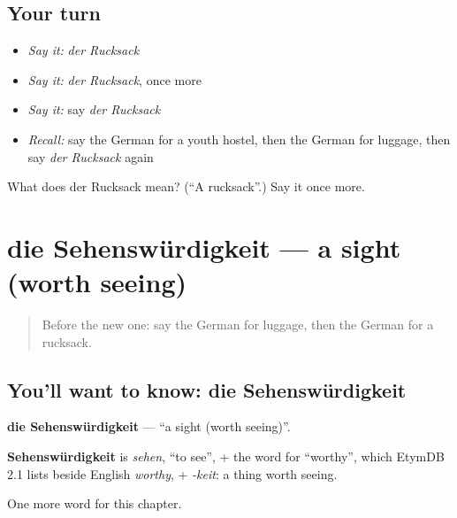 \subsection*{Your turn}
\begin{itemize}
\raggedright
  \item \emph{Say it:} \emph{der Rucksack}
  \item \emph{Say it:} \emph{der Rucksack}, once more
  \item \emph{Say it:} say \emph{der Rucksack}
  \item \emph{Recall:} say the German for a youth hostel, then the German for luggage, then say \emph{der Rucksack} again
\end{itemize}

\begin{tcolorbox}[breakable,colback=teal!4,colframe=teal!35!black,title={Before you move on}]
What does der Rucksack mean? (\textquotedblleft{}A rucksack\textquotedblright{}.) Say it once more.
\end{tcolorbox}
\section[die Sehenswürdigkeit]{die Sehenswürdigkeit — a sight (worth seeing)}

\label{lesson:GE-C194-sehenswuerdigkeit}



\begin{quote}
Before the new one: say the German for luggage, then the German for a rucksack.
\end{quote}

\subsection*{You'll want to know: die Sehenswürdigkeit}
\textbf{die Sehenswürdigkeit} — \textquotedblleft{}a sight (worth seeing)\textquotedblright{}.

\begin{cousinweb}
\textbf{Sehenswürdigkeit} is \emph{sehen}, \textquotedblleft{}to see\textquotedblright{}, + the word for \textquotedblleft{}worthy\textquotedblright{}, which EtymDB 2.1 lists beside English \emph{worthy}, + \emph{-keit}: a thing worth seeing.
\end{cousinweb}

\begin{grammarlens}[title={What you've built}]
One more word for this chapter.
\end{grammarlens}


